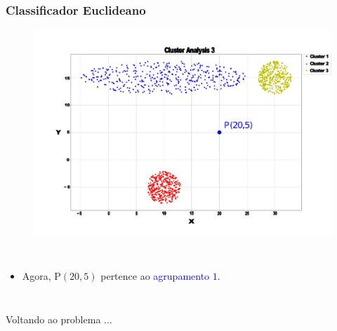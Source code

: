 \documentclass[aspectratio=10]{beamer} %
\begin{document}
%

\begin{frame}
	\frametitle{Classificador Euclideano}
	\begin{figure}[H]
		\includegraphics[scale=0.14]{Imagens/clusteranalise3blue.pdf}
	\end{figure}
	
	\begin{columns}
		\footnotesize
		\justifying
		\begin{itemize}
			\item Agora, P$(20,5)$ pertence ao  \textcolor{blue}{agrupamento $1$}.
		\end{itemize}
	\end{columns}
\end{frame}

\begin{frame}
	\begin{huge}
		\centering
		Voltando ao problema ...
	\end{huge}
\end{frame}
\end{document}
